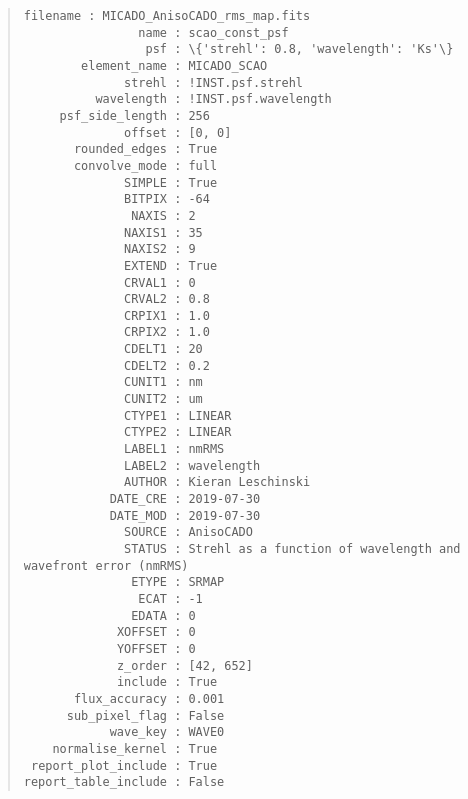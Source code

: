 \begin{quote}
\begin{alltt}
\begin{lstlisting}[frame=single]
            filename : MICADO_AnisoCADO_rms_map.fits
                name : scao_const_psf
                 psf : \{'strehl': 0.8, 'wavelength': 'Ks'\}
        element_name : MICADO_SCAO
              strehl : !INST.psf.strehl
          wavelength : !INST.psf.wavelength
     psf_side_length : 256
              offset : [0, 0]
       rounded_edges : True
       convolve_mode : full
              SIMPLE : True
              BITPIX : -64
               NAXIS : 2
              NAXIS1 : 35
              NAXIS2 : 9
              EXTEND : True
              CRVAL1 : 0
              CRVAL2 : 0.8
              CRPIX1 : 1.0
              CRPIX2 : 1.0
              CDELT1 : 20
              CDELT2 : 0.2
              CUNIT1 : nm
              CUNIT2 : um
              CTYPE1 : LINEAR
              CTYPE2 : LINEAR
              LABEL1 : nmRMS
              LABEL2 : wavelength
              AUTHOR : Kieran Leschinski
            DATE_CRE : 2019-07-30
            DATE_MOD : 2019-07-30
              SOURCE : AnisoCADO
              STATUS : Strehl as a function of wavelength and wavefront error (nmRMS)
               ETYPE : SRMAP
                ECAT : -1
               EDATA : 0
             XOFFSET : 0
             YOFFSET : 0
             z_order : [42, 652]
             include : True
       flux_accuracy : 0.001
      sub_pixel_flag : False
            wave_key : WAVE0
    normalise_kernel : True
 report_plot_include : True
report_table_include : False
\end{lstlisting}
\end{alltt}
\end{quote}
